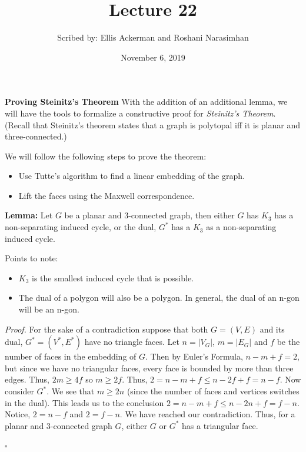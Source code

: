 \documentclass{article}
\begin{document}
  \title{Lecture 22}
  \author{Scribed by: Ellis Ackerman and Roshani Narasimhan}
  \date{November 6, 2019}
  \maketitle
  
  \noindent \textbf{Proving Steinitz's Theorem}
  \newline \noindent With the addition of an additional lemma, we will have the tools to formalize a constructive proof for \textit{Steinitz's Theorem}. (Recall that Steinitz's theorem states that a graph is polytopal iff it is planar and three-connected.)
  
  \medskip \noindent We will follow the following steps to prove the theorem:
  \begin{itemize}
      \item Use Tutte's algorithm to find a linear embedding of the graph.
      \item Lift the faces using the Maxwell correspondence.
  \end{itemize}
  \medskip  \noindent \textbf{Lemma:} Let $G$ be a planar and 3-connected graph, then either $G$ has $K_3$ has a non-separating induced cycle, or the dual, $G^*$ has a $K_3$ as a non-separating induced cycle. 
  
  \medskip \noindent Points to note:
  \begin{itemize}
      \item $K_3$ is the smallest induced cycle that is possible.
      \item The dual of a polygon will also be a polygon. In general, the dual of an n-gon will be an n-gon.
  \end{itemize}
  \smallskip  \noindent \textit{Proof.} For the sake of a contradiction suppose that both $G=(V,E)$ and its dual, $G^*=(V^*,E^*)$ have no triangle faces. Let $n=|V_G|$, $m=|E_G|$ and $f$ be the number of faces in the embedding of $G$. Then by Euler's Formula, $n-m+f=2$, but since we have no triangular faces, every face is bounded by more than three edges. Thus, $2m \geq 4f$ so $m \geq 2f$. Thus, $2=n-m+f \leq n -2f +f = n-f$. Now consider $G^*$. We see that $m \geq 2n$ (since the number of faces and vertices switches in the dual). This leads us to the conclusion $2=n-m+f \leq n-2n+f=f-n$. Notice, $2=n-f$ and $2=f-n$. We have reached our contradiction. Thus, for a planar and 3-connected graph $G$, either $G$ or $G^*$ has a triangular face. 
 \vspace{0.5mm} \begin{flushright} $\square$ \end{flushright}
  
\end{document}
